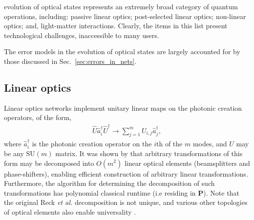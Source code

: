  evolution of optical states represents an extremely broad category of quantum operations, including: passive linear optics; post-selected linear optics; non-linear optics; and, light-matter interactions. Clearly, the items in this list present technological challenges, inaccessible to many users.

The error models in the evolution of optical states are largely accounted for by those discussed in Sec.~\ref{sec:errors_in_nets}. 

%
%

\subsection{Linear optics} \label{sec:LO_ev_archs} 

Linear optics networks \cite{bib:TanRohdeRev} implement unitary linear maps on the photonic creation operators, of the form,
\begin{align} \label{eq:LO_unitary_map}
\hat{U}\hat{a}_i^\dag \hat{U}^\dag \to \sum_{j=1}^m U_{i,j} \hat{a}^\dag_j,
\end{align}
where $\hat{a}^\dag_i$ is the photonic creation operator on the $i$th of the $m$ modes, and $U$ may be any $\mathrm{SU}(m)$ matrix. It was shown by \cite{bib:Reck94} that arbitrary transformations of this form may be decomposed into $O(m^2)$ linear optical elements (beamsplitters and phase-shifters), enabling efficient construction of arbitrary linear transformations. Furthermore, the algorithm for determining the decomposition of such transformations has polynomial classical runtime (i.e residing in \textbf{P}). Note that the original Reck \textit{et al.} decomposition is not unique, and various other topologies of optical elements also enable universality \cite{???}.

